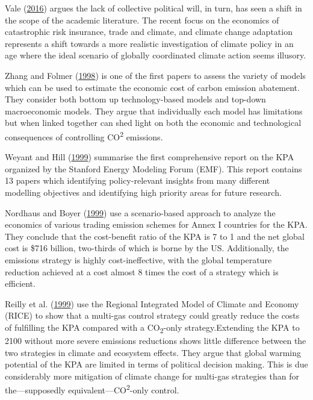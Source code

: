 \documentclass[
  12pt,
]{article}
\begin{document}
Vale (\protect\hyperlink{ref-Vale2016}{2016}) argues the lack of collective political will, in turn, has seen a shift in the scope of the academic literature. The recent focus on the economics of catastrophic risk insurance, trade and climate, and climate change adaptation represents a shift towards a more realistic investigation of climate policy in an age where the ideal scenario of globally coordinated climate action seems illusory.

Zhang and Folmer (\protect\hyperlink{ref-Zhang1998}{1998}) is one of the first papers to assess the variety of models which can be used to estimate the economic cost of carbon emission abatement. They consider both bottom up technology-based models and top-down macroeconomic models. They argue that individually each model has limitations but when linked together can shed light on both the economic and technological consequences of controlling CO\textsuperscript{2} emissions.

Weyant and Hill (\protect\hyperlink{ref-Weyant1999}{1999}) summarise the first comprehensive report on the KPA organized by the Stanford Energy Modeling Forum (EMF). This report contains 13 papers which identifying policy-relevant insights from many different modelling objectives and identifying high priority areas for future research.

Nordhaus and Boyer (\protect\hyperlink{ref-Nordhaus1999}{1999}) use a scenario-based approach to analyze the economics of various trading emission schemes for Annex I countries for the KPA. They conclude that the cost-benefit ratio of the KPA is 7 to 1 and the net global cost is \$716 billion, two-thirds of which is borne by the US. Additionally, the emissions strategy is highly cost-ineffective, with the global temperature reduction achieved at a cost almost 8 times the cost of a strategy which is efficient.

Reilly et al. (\protect\hyperlink{ref-Reilly1999}{1999}) use the Regional Integrated Model of Climate and Economy (RICE) to show that a multi-gas control strategy could greatly reduce the costs of fulfilling the KPA compared with a CO\textsubscript{2}-only strategy.Extending the KPA to 2100 without more severe emissions reductions shows little difference between the two strategies in climate and ecosystem effects. They argue that global warming potential of the KPA are limited in terms of political decision making. This is due considerably more mitigation of climate change for multi-gas strategies than for the---supposedly equivalent---CO\textsuperscript{2}-only control.
\end{document}
